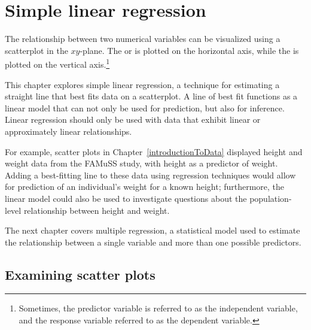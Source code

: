 
\chapter{Simple linear regression}
\label{linRegrForTwoVar}

The relationship between two numerical variables can be visualized using a scatterplot in the $xy$-plane. The  or  is plotted on the horizontal axis, while the  is plotted on the vertical axis.\footnote{Sometimes, the predictor variable is referred to as the independent variable, and the response variable referred to as the dependent variable.} 

This chapter explores simple linear regression, a technique for estimating a straight line that best fits data on a scatterplot. A line of best fit functions as a linear model that can not only be used for prediction, but also for inference. Linear regression should only be used with data that exhibit linear or approximately linear relationships. 

For example, scatter plots in Chapter~\ref{introductionToData} displayed height and weight data from the FAMuSS study, with height as a predictor of weight. Adding a best-fitting line to these data using regression techniques would allow for prediction of an individual's weight for a known height; furthermore, the linear model could also be used to investigate questions about the population-level relationship between height and weight. 

The next chapter covers multiple regression, a statistical model used to estimate the relationship between a single variable and more than one possible predictors.

\section{Examining scatter plots}
\label{examiningScatterPlots}

